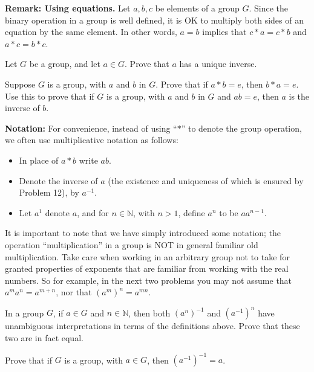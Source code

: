 \textbf{Remark: Using equations.} Let \(a, b, c\) be elements of a group \(G\). Since the binary operation in a group is well defined, it is OK to multiply both sides of an equation by the same element. In other words, \(a = b\) implies that \( c * a = c * b\) and \(a * c = b * c\).

\begin{problem}
Let \(G\) be a group, and let \(a \in G\). Prove that \(a\) has a unique inverse.
\end{problem}

\begin{problem}
Suppose \(G\) is a group, with \(a\) and \(b\) in \(G\). Prove that if \(a * b = e\), then \(b * a = e\). Use this to prove that if \(G\) is a group, with \(a\) and \(b\) in \(G\) and \(ab = e\), then \(a\) is the inverse of \(b\).
\end{problem}

\textbf{Notation:} For convenience, instead of using ``\(*\)'' to denote the group operation, we often use multiplicative notation as follows:
\begin{itemize}
  \item In place of \(a * b\) write \(ab\).
  \item Denote the inverse of \(a\) (the existence and uniqueness of which is ensured by Problem 12), by \(a^{-1}\).
  \item Let \(a^1\) denote \(a\), and for \(n \in \mathbb{N}\), with \(n > 1\), define \(a^n\) to be \(aa^{n-1}\).
\end{itemize}

It is important to note that we have simply introduced some notation; the operation ``multiplication'' in a group is NOT in general familiar old multiplication. Take care when working in an arbitrary group not to take for granted properties of exponents that are familiar from working with the real numbers. So for example, in the next two problems you may not assume that \(a^ma^n = a^{m+n}\), nor that \((a^m)^n = a^{mn}\).

\begin{problem}\label{prob:powinv}
In a group \(G\), if \(a \in G\) and \(n \in \mathbb{N}\), then both \( (a^n)^{-1}\) and \((a^{-1})^n\) have unambiguous interpretations in terms of the definitions above. Prove that these two are in fact equal.
\end{problem}

\begin{problem}
Prove that if \(G\) is a group, with \(a \in G\), then \((a^{-1})^{-1} = a\).
\end{problem}

